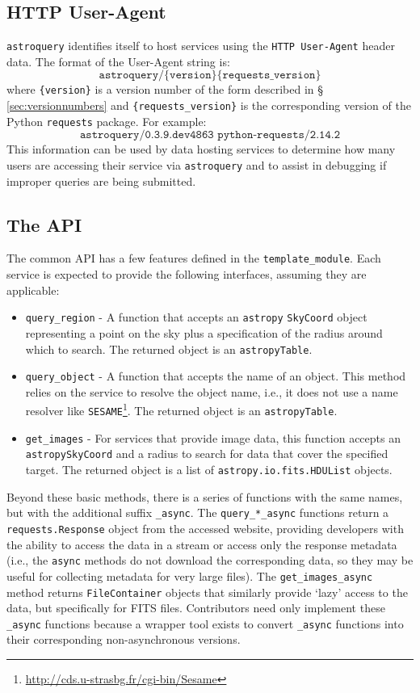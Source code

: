 \documentclass[twocolumn]{aastex62}
\newcommand{\package}[1]{\texttt{#1}\xspace}
\newcommand{\astroquery}{\package{astroquery}}
\newcommand{\astropypkg}{\package{astropy}}
\begin{document}
\subsection{HTTP User-Agent}
\label{sec:useragent}
\astroquery identifies itself to host services using the \texttt{HTTP
User-Agent} header data.  The format of the User-Agent string is:
\[\texttt{astroquery/\{version\} \{requests\_version\}}\] where
\texttt{\{version\}} is a version number of the form described in \S
\ref{sec:versionnumbers} and \texttt{\{requests\_version\}} is the
corresponding version of the Python \package{requests} package. For example:
\[\texttt{astroquery/0.3.9.dev4863 python-requests/2.14.2}\]
This information
can be used by data hosting services to determine how many users are accessing
their service via \astroquery and to assist in debugging if improper queries
are being submitted.


\subsection{The API}
The common API has a few features defined in the \texttt{template\_module}.
Each service is expected to provide the following interfaces, assuming they are
applicable:

\begin{itemize}
    \item \texttt{query\_region} - A function that accepts an \astropypkg
        \texttt{SkyCoord} object representing a point on the sky plus a
        specification of the radius around which to search.
        The returned object is an \astropypkg \texttt{Table}.
    \item \texttt{query\_object} - A function that accepts the name of an
        object.  This method relies on the service to resolve the object name, i.e., it does not use a name resolver
        like \texttt{SESAME}\footnote{\url{http://cds.u-strasbg.fr/cgi-bin/Sesame}}.
        The returned object is an \astropypkg \texttt{Table}.
    \item \texttt{get\_images} - For services that provide image data, this
        function accepts an \astropypkg \texttt{SkyCoord} and a radius to search for data
        that cover the specified target. The returned object is a list
        of \texttt{astropy.io.fits.HDUList} objects.

\end{itemize}

Beyond these basic methods, there is a series of functions with the same
names, but with the additional suffix \texttt{\_async}.  The
\texttt{query\_*\_async} functions return a \texttt{requests.Response} object
from the accessed website, providing developers with
the ability to access the data in a stream or access only the response
metadata (i.e., the \texttt{async} methods do not download the corresponding
data, so they may be useful for collecting metadata for very large files).  The
\texttt{get\_images\_async} method returns
\texttt{FileContainer} objects that similarly provide `lazy' access to the
data, but specifically for FITS files.  Contributors need only implement
these \texttt{\_async} functions because a wrapper tool exists to convert
\texttt{\_async} functions into their corresponding non-asynchronous versions.
\end{document}
